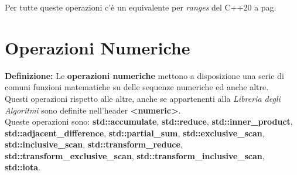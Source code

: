 \textsf{\small Per tutte queste operazioni c'è un equivalente per \emph{ranges} del C++20 a pag. \pageref{ranges_permutation}} \\


\newpage

\section{Operazioni Numeriche}

\textsf{\small \textbf{Definizione: } Le \textbf{operazioni numeriche} mettono a disposizione una serie di comuni funzioni matematiche su delle sequenze numeriche ed anche altre.} \\

\textsf{\small Questi operazioni rispetto alle altre, anche se appartenenti alla \emph{Libreria degli Algoritmi} sono definite nell'header \textbf{<numeric>}.} \\

\textsf{\small Queste operazioni sono: \textbf{std::accumulate}, \textbf{std::reduce}, \textbf{std::inner\_product}, \textbf{std::adjacent\_difference}, \textbf{std::partial\_sum}, \textbf{std::exclusive\_scan}, \textbf{std::inclusive\_scan}, \textbf{std::transform\_reduce}, \textbf{std::transform\_exclusive\_scan}, \textbf{std::transform\_inclusive\_scan}, \textbf{std::iota}.} \\

